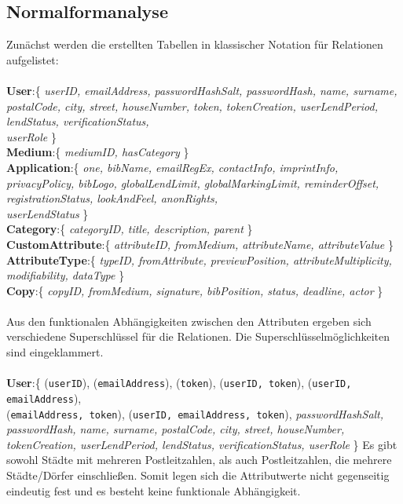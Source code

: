 \documentclass{article}
\begin{document}
\subsection{Normalformanalyse}
Zunächst werden die erstellten Tabellen in klassischer Notation für Relationen aufgelistet: \\
\\
\textbf{User}:\{ \textit{userID, emailAddress, passwordHashSalt, passwordHash, name, surname, postalCode, city, street, houseNumber, token, tokenCreation, userLendPeriod, lendStatus, verificationStatus,\\ userRole} \}\\
\textbf{Medium}:\{ \textit{mediumID, hasCategory} \}\\
\textbf{Application}:\{ \textit{one, bibName, emailRegEx, contactInfo, imprintInfo, privacyPolicy, bibLogo, globalLendLimit, globalMarkingLimit, reminderOffset, registrationStatus, lookAndFeel, anonRights,\\ userLendStatus} \}\\
\textbf{Category}:\{ \textit{categoryID, title, description, parent} \}\\
\textbf{CustomAttribute}:\{ \textit{attributeID, fromMedium, attributeName, attributeValue} \}\\
\textbf{AttributeType}:\{ \textit{typeID, fromAttribute, previewPosition, attributeMultiplicity, modifiability, dataType} \}\\
\textbf{Copy}:\{ \textit{copyID, fromMedium, signature, bibPosition, status, deadline, actor} \}\\
\\
Aus den funktionalen Abhängigkeiten zwischen den Attributen ergeben sich verschiedene Superschlüssel für die Relationen. Die Superschlüsselmöglichkeiten sind eingeklammert.\\
\\
\textbf{User}:\{ (\texttt{userID}), (\texttt{emailAddress}), (\texttt{token}), (\texttt{userID, token}), (\texttt{userID, emailAddress}), \\ (\texttt{emailAddress, token}), (\texttt{userID, emailAddress, token}), \textit{passwordHashSalt, passwordHash, name, surname, postalCode, city, street, houseNumber, tokenCreation, userLendPeriod, lendStatus, verificationStatus, userRole} \}
Es gibt sowohl Städte mit mehreren Postleitzahlen, als auch Postleitzahlen, die mehrere Städte/Dörfer einschließen. Somit legen sich die Attributwerte nicht gegenseitig eindeutig fest und es besteht keine funktionale Abhängigkeit.\\
\end{document}
